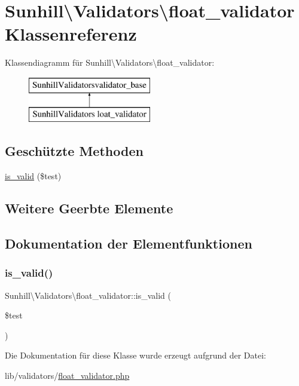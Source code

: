 \hypertarget{classSunhill_1_1Validators_1_1float__validator}{}\section{Sunhill\textbackslash{}Validators\textbackslash{}float\+\_\+validator Klassenreferenz}
\label{classSunhill_1_1Validators_1_1float__validator}
Klassendiagramm für Sunhill\textbackslash{}Validators\textbackslash{}float\+\_\+validator\+:\begin{figure}[H]
\begin{center}
\leavevmode
\includegraphics[height=2.000000cm]{d0/d5d/classSunhill_1_1Validators_1_1float__validator}
\end{center}
\end{figure}
\subsection*{Geschützte Methoden}
\begin{DoxyCompactItemize}
\item 
\hyperlink{classSunhill_1_1Validators_1_1float__validator_afe1ff1b046731f0371fa6dfbac030a1b}{is\+\_\+valid} (\$test)
\end{DoxyCompactItemize}
\subsection*{Weitere Geerbte Elemente}


\subsection{Dokumentation der Elementfunktionen}
\mbox{\label{classSunhill_1_1Validators_1_1float__validator_afe1ff1b046731f0371fa6dfbac030a1b}} 
\subsubsection{\texorpdfstring{is\+\_\+valid()}{is\_valid()}}
{\footnotesize\ttfamily Sunhill\textbackslash{}\+Validators\textbackslash{}float\+\_\+validator\+::is\+\_\+valid (\begin{DoxyParamCaption}\item[{}]{\$test }\end{DoxyParamCaption})\hspace{0.3cm}{\ttfamily [protected]}}



Die Dokumentation für diese Klasse wurde erzeugt aufgrund der Datei\+:\begin{DoxyCompactItemize}
\item 
lib/validators/\hyperlink{float__validator_8php}{float\+\_\+validator.\+php}\end{DoxyCompactItemize}
